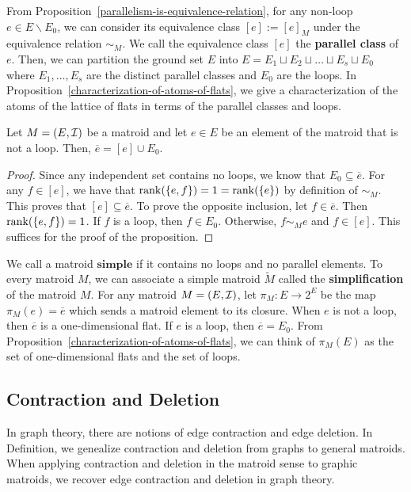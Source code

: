 \documentclass{puthesis-UG}
\begin{document}
From Proposition~\ref{parallelism-is-equivalence-relation}, for any non-loop $e \in E \backslash E_0$, we can consider its equivalence class $[e] := [e]_M$ under the equivalence relation $\sim_M$. We call the equivalence class $[e]$ the \textbf{parallel class} of $e$. Then, we can partition the ground set $E$ into $E = E_1 \sqcup E_2 \sqcup \ldots \sqcup E_s \sqcup E_0$ where $E_1, \ldots, E_s$ are the distinct parallel classes and $E_0$ are the loops. In Proposition~\ref{characterization-of-atoms-of-flats}, we give a characterization of the atoms of the lattice of flats in terms of the parallel classes and loops. 

\begin{prop} \label{characterization-of-atoms-of-flats}
	Let $M = (E, \mathcal{I})$ be a matroid and let $e \in E$ be an element of the matroid that is not a loop. Then, $\overline{e} = [e] \cup E_0$.
\end{prop}

\begin{proof}
	Since any independent set contains no loops, we know that $E_0 \subseteq \overline{e}$. For any $f \in [e]$, we have that $\operatorname{rank} (\{e, f\}) = 1 = \operatorname{rank} (\{e\})$ by definition of $\sim_M$. This proves that $[e] \subseteq \overline{e}$. To prove the opposite inclusion, let $f \in \overline{e}$. Then $\operatorname{rank}(\{e, f\}) = 1$. If $f$ is a loop, then $f \in E_0$. Otherwise, $f \sim_M e$ and $f \in [e]$. This suffices for the proof of the proposition. 
\end{proof}

We call a matroid $\textbf{simple}$ if it contains no loops and no parallel elements. To every matroid $M$, we can associate a simple matroid $\widetilde{M}$ called the \textbf{simplification} of the matroid $M$. For any matroid $M = (E, \mathcal{I})$, let $\pi_M : E \to 2^E$ be the map $\pi_M (e) = \overline{e}$ which sends a matroid element to its closure. When $e$ is not a loop, then $\overline{e}$ is a one-dimensional flat. If $e$ is a loop, then $\overline{e} = E_0$. From Proposition~\ref{characterization-of-atoms-of-flats}, we can think of $\pi_M (E)$ as the set of one-dimensional flats and the set of loops. 

\subsection{Contraction and Deletion}

In graph theory, there are notions of edge contraction and edge deletion. In Definition, we genealize contraction and deletion from graphs to general matroids. When applying contraction and deletion in the matroid sense to graphic matroids, we recover edge contraction and deletion in graph theory.  
\end{document}
